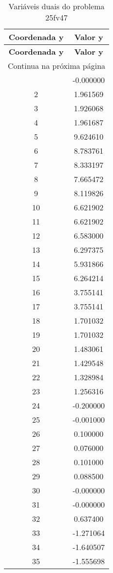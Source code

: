 \documentclass[12pt]{article}
\begin{document}
\begin{longtable}{@{}cc@{}}
\caption{Variáveis duais do problema 25fv47} \\
\toprule
\textbf{Coordenada y} & \textbf{Valor y} \\
\midrule
\endfirsthead

\toprule
\textbf{Coordenada y} & \textbf{Valor y} \\
\midrule
\endhead

\midrule \multicolumn{2}{r}{{Continua na próxima página}} \\ \midrule
\endfoot

\bottomrule
\endlastfoot
1 & -0.000000 \\
2 & 1.961569 \\
3 & 1.926068 \\
4 & 1.961687 \\
5 & 9.624610 \\
6 & 8.783761 \\
7 & 8.333197 \\
8 & 7.665472 \\
9 & 8.119826 \\
10 & 6.621902 \\
11 & 6.621902 \\
12 & 6.583000 \\
13 & 6.297375 \\
14 & 5.931866 \\
15 & 6.264214 \\
16 & 3.755141 \\
17 & 3.755141 \\
18 & 1.701032 \\
19 & 1.701032 \\
20 & 1.483061 \\
21 & 1.429548 \\
22 & 1.328984 \\
23 & 1.256316 \\
24 & -0.200000 \\
25 & -0.001000 \\
26 & 0.100000 \\
27 & 0.076000 \\
28 & 0.101000 \\
29 & 0.088500 \\
30 & -0.000000 \\
31 & -0.000000 \\
32 & 0.637400 \\
33 & -1.271064 \\
34 & -1.640507 \\
35 & -1.555698 \\

\end{longtable}
\end{document}
